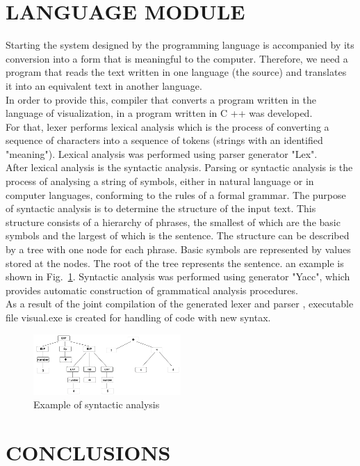 \documentclass[a4paper, 10pt, conference]{ieeeconf}
\begin{document}
\section{LANGUAGE MODULE}
Starting the system designed by the programming language is accompanied by its conversion into a form that is meaningful to the computer. Therefore, we need a program that reads the text written in one language (the source) and translates it into an equivalent text in another language.\\
In order to provide this, compiler that converts a program written in the language of visualization, in a program written in C ++ was developed.\\
For that, lexer performs lexical analysis which is the process of converting a sequence of characters  into a sequence of tokens (strings with an identified "meaning"). Lexical analysis was performed using parser generator "Lex".\\
After lexical analysis is the syntactic analysis. Parsing or syntactic analysis is the process of analysing a string of symbols, either in natural language or in computer languages, conforming to the rules of a formal grammar. The purpose of syntactic analysis is to determine the structure of the input text. This structure consists of a hierarchy of phrases, the smallest of which are the basic symbols and the largest of which is the sentence. The structure can be described by a tree with one node for each phrase. Basic symbols are represented by values stored at the nodes. The root of the tree represents the sentence. an example is shown in Fig.~\ref{fig:parsetree}. Syntactic analysis was performed using generator "Yacc", which provides automatic construction of grammatical analysis procedures.\\
As a result of the joint compilation of the generated lexer and parser , executable file visual.exe is created for handling of code with new syntax.
\begin{figure}[h]
    \centering
    \includegraphics[width=0.5\textwidth]{parsetree.png}
    \caption{Example of syntactic analysis}
    \label{fig:parsetree}
\end{figure}

\section{CONCLUSIONS}
\end{document}
